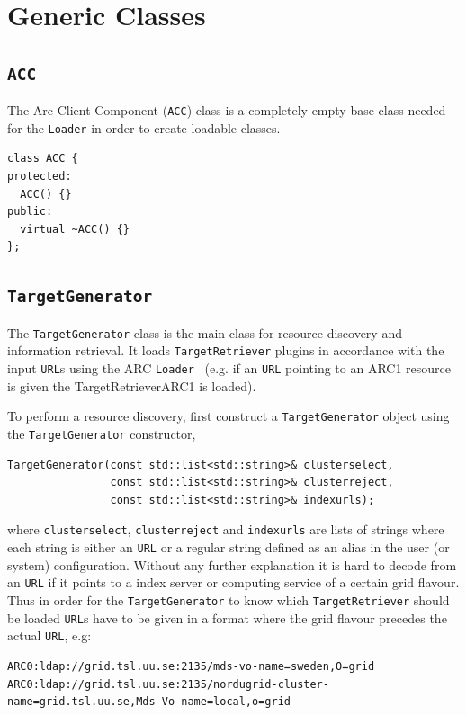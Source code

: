 \documentclass{book}
\newcommand{\ACC}{\texttt{ACC}}
\newcommand{\TargetGenerator}{\texttt{TargetGenerator}}
\newcommand{\TargetRetriever}{\texttt{TargetRetriever}}
\newcommand{\URL}{\texttt{URL}}
\newcommand{\Loader}{\texttt{Loader}}
\begin{document}
\section{Generic Classes}
\subsection{{\ACC}}
The Arc Client Component ({\ACC}) class is a completely empty base class needed for the {\Loader} 
in order to create loadable classes.

\begin{shaded}
\begin{verbatim}
class ACC {
protected:
  ACC() {}
public:
  virtual ~ACC() {}
};
\end{verbatim}
\end{shaded}

\subsection{{\TargetGenerator}} The {\TargetGenerator} class is the main class for resource discovery and information retrieval. It loads 
{\TargetRetriever} plugins in accordance with the input {\URL}s using the ARC {\Loader}~\cite{hed} (e.g. if an {\URL} pointing to an ARC1 
resource is given the TargetRetrieverARC1 is loaded).

To perform a resource discovery, first construct a {\TargetGenerator} object using the {\TargetGenerator} constructor,

\begin{shaded}
\begin{verbatim}
TargetGenerator(const std::list<std::string>& clusterselect,
                const std::list<std::string>& clusterreject,
                const std::list<std::string>& indexurls);
\end{verbatim}
\end{shaded}

where \texttt{clusterselect}, \texttt{clusterreject} and \texttt{indexurls} are lists of strings where each string is either 
an {\URL} or a regular string defined as an alias in the user (or system) configuration. Without any further explanation it is 
hard to decode from an {\URL} if it points to a index server or computing service of a certain grid flavour. Thus in order for 
the {\TargetGenerator} to know which {\TargetRetriever} should be loaded {\URL}s have to be given in a format where the grid 
flavour precedes the actual {\URL}, e.g:

\begin{shaded}
\begin{small}
\begin{verbatim}
ARC0:ldap://grid.tsl.uu.se:2135/mds-vo-name=sweden,O=grid
ARC0:ldap://grid.tsl.uu.se:2135/nordugrid-cluster-name=grid.tsl.uu.se,Mds-Vo-name=local,o=grid
\end{verbatim}
\end{small}
\end{shaded}
\end{document}
